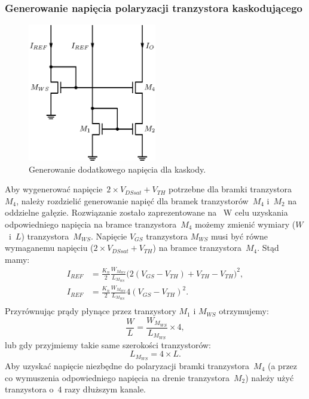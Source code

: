 \documentclass[twoside,pl,final]{labman}
\begin{document}
\subsubsection{Generowanie napięcia polaryzacji tranzystora kaskodującego}
\label{cascode:wideswing:mws}

\begin{figure}[!htbp]
  \centering
  \includegraphics[width=0.5\textwidth]{cascode_gen}
  \caption{Generowanie dodatkowego napięcia dla kaskody.}
  \label{fig:cascode:wideswing:gen}
\end{figure}

Aby wygenerować napięcie~$2 \times V_{DSsat} + V_{TH}$ potrzebne
dla bramki tranzystora~$M_4$, należy rozdzielić generowanie napięć dla bramek
tranzystorów~$M_4$ i~$M_2$ na oddzielne gałęzie.
Rozwiązanie zostało zaprezentowane na~
W celu uzyskania odpowiedniego napięcia na bramce tranzystora~$M_4$
możemy zmienić wymiary ($W$~i~$L$) tranzystora~$M_{WS}$.
Napięcie $V_{GS}$ tranzystora $M_{WS}$ musi być równe wymaganemu
napięciu ($2 \times V_{DSsat} + V_{TH}$) na bramce tranzystora~$M_4$.
Stąd mamy:
\begin{align}
  I_{REF} &= \frac{K_n}{2} \frac{W_{M_{WS}}}{L_{M_{WS}}}
    \big(2 ( V_{GS} - V_{TH}) + V_{TH} - V_{TH} \big)^2, \nonumber \\
  I_{REF} &= \frac{K_n}{2} \frac{W_{M_{WS}}}{L_{M_{WS}}}
    4 ( V_{GS} - V_{TH} )^2. \nonumber \\
\end{align}
Przyrównując prądy płynące przez tranzystory $M_1$ i $M_{WS}$ otrzymujemy:
\begin{equation}
  \frac{W}{L} = \frac{W_{M_{WS}}}{L_{M_{WS}}} \times 4,
\end{equation}
lub gdy przyjmiemy takie same szerokości tranzystorów:
\begin{equation}
  L_{M_{WS}} = 4 \times L.
\end{equation}
Aby uzyskać napięcie niezbędne do polaryzacji bramki tranzystora~$M_4$
(a przez co wymuszenia odpowiedniego napięcia na drenie tranzystora~$M_2$)
należy użyć tranzystora o~$4$ razy dłuższym kanale.
\end{document}
